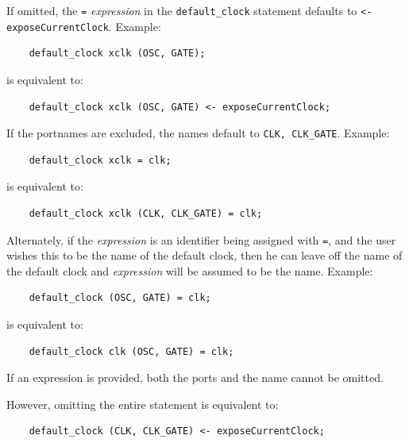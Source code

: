 \documentclass[twoside,letterpaper]{article}
\newcommand{\te}[1]{\texttt{#1}}
\newcommand{\nterm}[1]{\emph{#1}}
\newcommand{\term}[1]{\texttt{#1}}
\begin{document}


If omitted, the \texttt{=} \nterm{expression} in the \texttt{default\_clock}
statement defaults to \texttt{<- exposeCurrentClock}.
Example:
\begin{verbatim}
    default_clock xclk (OSC, GATE);
\end{verbatim}
is equivalent to:
\begin{verbatim}
    default_clock xclk (OSC, GATE) <- exposeCurrentClock;
\end{verbatim}


If the portnames are excluded, the names default to \te{CLK,
CLK\_GATE}.  Example:
\begin{verbatim}
    default_clock xclk = clk;
\end{verbatim}
is equivalent to:
\begin{verbatim}
    default_clock xclk (CLK, CLK_GATE) = clk;
\end{verbatim}
    




Alternately, if the \nterm{expression} is an identifier being assigned with
\term{=}, and the user wishes this to be the name of the default clock, then
he can leave off the name of the default clock and \nterm{expression}
will be assumed to be the name.  Example:
\begin{verbatim}
    default_clock (OSC, GATE) = clk;
\end{verbatim} 
is equivalent to: 
\begin{verbatim}
    default_clock clk (OSC, GATE) = clk;
\end{verbatim}

If an expression is provided, both the ports and the name cannot be omitted.

However, omitting the entire statement is equivalent to:
\begin{verbatim}
    default_clock (CLK, CLK_GATE) <- exposeCurrentClock;
\end{verbatim}
\end{document}
